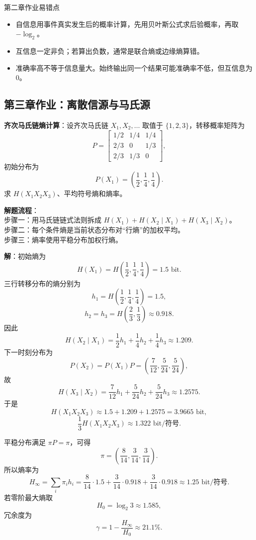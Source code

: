 \begin{warningBox}{第二章作业易错点}
\begin{itemize}
  \item 自信息用事件真实发生后的概率计算，先用贝叶斯公式求后验概率，再取 $-\log_2$。
  \item 互信息一定非负；若算出负数，通常是联合熵或边缘熵算错。
  \item 准确率高不等于信息量大。始终输出同一个结果可能准确率不低，但互信息为 $0$。
\end{itemize}
\end{warningBox}

\subsection{第三章作业：离散信源与马氏源}

\begin{example}
\label{hw:ch3-homogeneous-markov-entropy}
\textbf{齐次马氏链熵计算}：设齐次马氏链 $X_1,X_2,\dots$ 取值于 $\{1,2,3\}$，转移概率矩阵为
\[
P=\begin{bmatrix}
1/2&1/4&1/4\\
2/3&0&1/3\\
2/3&1/3&0
\end{bmatrix},
\]
初始分布为
\[
P(X_1)=\left(\frac12,\frac14,\frac14\right).
\]
求 $H(X_1X_2X_3)$、平均符号熵和熵率。

\noindent \textbf{解题流程}：\\[2pt]
步骤一：用马氏链链式法则拆成 $H(X_1)+H(X_2\mid X_1)+H(X_3\mid X_2)$。\\
步骤二：每个条件熵是当前状态分布对“行熵”的加权平均。\\
步骤三：熵率使用平稳分布加权行熵。

\textbf{解}：初始熵为
\[
H(X_1)=H\left(\frac12,\frac14,\frac14\right)=1.5\text{ bit}.
\]
三行转移分布的熵分别为
\[
h_1=H\left(\frac12,\frac14,\frac14\right)=1.5,
\]
\[
h_2=h_3=H\left(\frac23,\frac13\right)\approx0.918.
\]
因此
\[
H(X_2\mid X_1)=\frac12h_1+\frac14h_2+\frac14h_3\approx1.209.
\]
下一时刻分布为
\[
P(X_2)=P(X_1)P=\left(\frac7{12},\frac5{24},\frac5{24}\right),
\]
故
\[
H(X_3\mid X_2)=\frac7{12}h_1+\frac5{24}h_2+\frac5{24}h_3
\approx1.2575.
\]
于是
\[
H(X_1X_2X_3)\approx1.5+1.209+1.2575=3.9665\text{ bit},
\]
\[
\frac13H(X_1X_2X_3)\approx1.322\text{ bit/符号}.
\]

平稳分布满足 $\pi P=\pi$，可得
\[
\pi=\left(\frac8{14},\frac3{14},\frac3{14}\right).
\]
所以熵率为
\[
H_\infty=\sum_i\pi_i h_i
=\frac8{14}\cdot1.5+\frac3{14}\cdot0.918+\frac3{14}\cdot0.918
\approx1.25\text{ bit/符号}.
\]
若零阶最大熵取
\[
H_0=\log_2 3\approx1.585,
\]
冗余度为
\[
\gamma=1-\frac{H_\infty}{H_0}
\approx21.1\%.
\]
\end{example}

